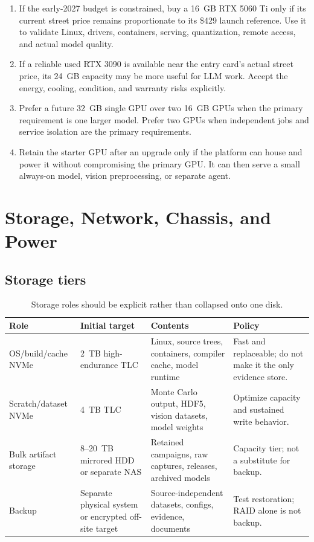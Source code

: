 \documentclass[11pt]{article}
\begin{document}
\begin{enumerate}
  \item If the early-2027 budget is constrained, buy a 16~GB RTX 5060 Ti only
        if its current street price remains proportionate to its \$429 launch
        reference. Use it to validate Linux, drivers, containers, serving,
        quantization, remote access, and actual model quality.
  \item If a reliable used RTX 3090 is available near the entry card's actual
        street price, its 24~GB capacity may be more useful for LLM work. Accept
        the energy, cooling, condition, and warranty risks explicitly.
  \item Prefer a future 32~GB single GPU over two 16~GB GPUs when the primary
        requirement is one larger model. Prefer two GPUs when independent jobs
        and service isolation are the primary requirements.
  \item Retain the starter GPU after an upgrade only if the platform can house
        and power it without compromising the primary GPU. It can then serve a
        small always-on model, vision preprocessing, or separate agent.
\end{enumerate}

\section{Storage, Network, Chassis, and Power}

\subsection{Storage tiers}

\begin{table}[htbp]
\centering
\small
\begin{tabularx}{\textwidth}{L{0.19\textwidth} L{0.22\textwidth} Y L{0.20\textwidth}}
\toprule
Role & Initial target & Contents & Policy \\
\midrule
OS/build/cache NVMe & 2~TB high-endurance TLC & Linux, source trees, containers, compiler cache, model runtime & Fast and replaceable; do not make it the only evidence store. \\
Scratch/dataset NVMe & 4~TB TLC & Monte Carlo output, HDF5, vision datasets, model weights & Optimize capacity and sustained write behavior. \\
Bulk artifact storage & 8--20~TB mirrored HDD or separate NAS & Retained campaigns, raw captures, releases, archived models & Capacity tier; not a substitute for backup. \\
Backup & Separate physical system or encrypted off-site target & Source-independent datasets, configs, evidence, documents & Test restoration; RAID alone is not backup. \\
\bottomrule
\end{tabularx}
\caption{Storage roles should be explicit rather than collapsed onto one disk.}
\end{table}
\end{document}
